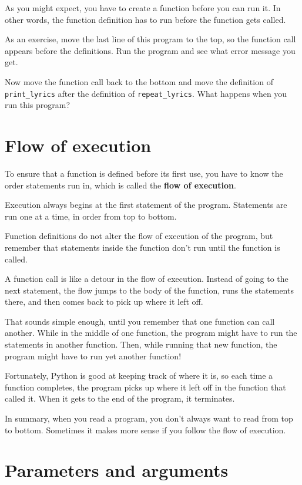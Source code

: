 As you might expect, you have to create a function before you can
run it.  In other words, the function definition has to run
before the function gets called.

As an exercise, move the last line of this program
to the top, so the function call appears before the definitions. Run
the program and see what error
message you get.

Now move the function call back to the bottom
and move the definition of \verb"print_lyrics" after the definition of
\verb"repeat_lyrics".  What happens when you run this program?


%
\section{Flow of execution}

To ensure that a function is defined before its first use,
you have to know the order statements run in, which is
called the {\bf flow of execution}.

Execution always begins at the first statement of the program.
Statements are run one at a time, in order from top to bottom.

Function definitions do not alter the flow of execution of the
program, but remember that statements inside the function don't
run until the function is called.

A function call is like a detour in the flow of execution. Instead of
going to the next statement, the flow jumps to the body of
the function, runs the statements there, and then comes back
to pick up where it left off.

That sounds simple enough, until you remember that one function can
call another.  While in the middle of one function, the program might
have to run the statements in another function.  Then, while
running that new function, the program might have to run yet
another function!

Fortunately, Python is good at keeping track of where it is, so each
time a function completes, the program picks up where it left off in
the function that called it.  When it gets to the end of the program,
it terminates.

In summary, when you read a program, you
don't always want to read from top to bottom.  Sometimes it makes
more sense if you follow the flow of execution.


%
\section{Parameters and arguments}
\label{parameters}

